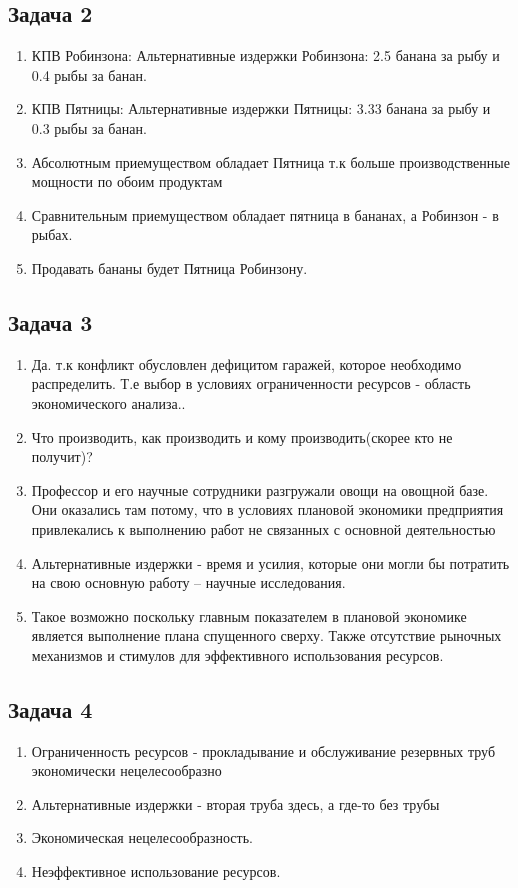 \documentclass[a4paper,12pt]{article}
\begin{document}
\subsection{Задача 2}
\begin{enumerate}
    \item КПВ Робинзона: Альтернативные издержки Робинзона: 2.5 банана за рыбу и 0.4 рыбы за банан.
    \item КПВ Пятницы: Альтернативные издержки Пятницы: 3.33 банана за рыбу и 0.3 рыбы за банан.
    \item Абсолютным приемуществом обладает Пятница т.к больше производственные мощности по обоим продуктам
    \item Сравнительным приемуществом обладает пятница в бананах, а Робинзон - в рыбах.
    \item Продавать бананы будет Пятница Робинзону.
\end{enumerate}

\subsection{Задача 3}
\begin{enumerate}
    \item Да. т.к конфликт обусловлен дефицитом гаражей, которое необходимо распределить. Т.е выбор в условиях ограниченности ресурсов - область экономического анализа..
    \item Что производить, как производить и кому производить(скорее кто не получит)?
    \item Профессор и его научные сотрудники разгружали овощи на овощной базе. Они оказались там потому, что в условиях плановой экономики предприятия привлекались к выполнению работ не связанных с основной деятельностью
    \item Альтернативные издержки - время и усилия, которые они могли бы потратить на свою основную работу – научные исследования.
    \item Такое возможно поскольку главным показателем в плановой экономике является выполнение плана спущенного сверху. Также отсутствие рыночных механизмов и стимулов для эффективного использования ресурсов.
\end{enumerate}

\subsection{Задача 4}
\begin{enumerate}
    \item Ограниченность ресурсов - прокладывание и обслуживание резервных труб экономически нецелесообразно
    \item Альтернативные издержки - вторая труба здесь, а где-то без трубы
    \item Экономическая нецелесообразность.
    \item Неэффективное использование ресурсов.
\end{enumerate}
\end{document}
